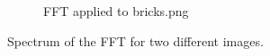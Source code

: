 \begin{figure}[H]
\begin{subfigure}{0.5\textwidth}
        \caption{FFT applied to bricks.png}
    \end{subfigure}

    \caption{Spectrum of the FFT for two different images.}
    \label{fig:3-1}
\end{figure}

